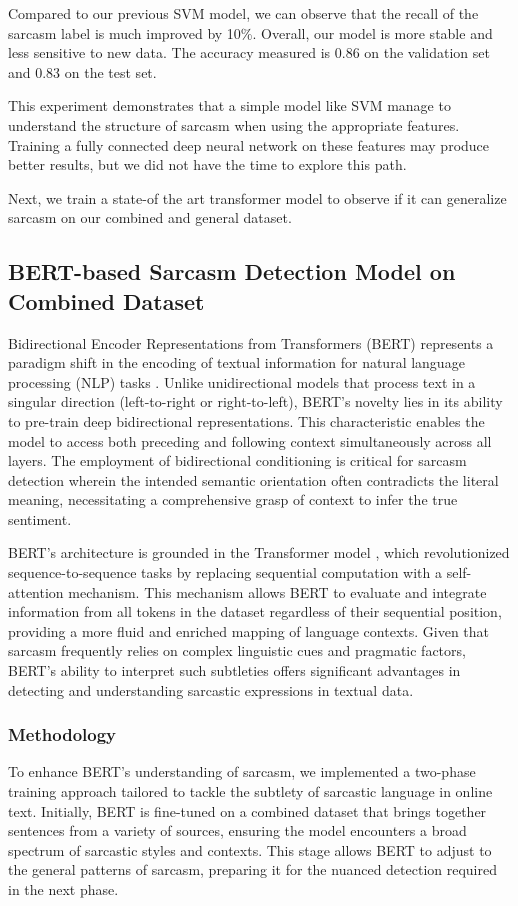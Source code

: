 \documentclass[10pt,twocolumn,letterpaper]{article}
\begin{document}
Compared to our previous SVM model, we can observe that the recall of the sarcasm label is much improved by 10\%.
Overall, our model is more stable and less sensitive to new data.
The accuracy measured is 0.86 on the validation set and 0.83 on the test set.

This experiment demonstrates that a simple model like SVM manage to understand the structure of sarcasm when using the appropriate features.
Training a fully connected deep neural network on these features may produce better results, but we did not have the time to explore this path.

Next, we train a state-of the art transformer model to observe if it can generalize sarcasm on our combined and general dataset.

\subsection{BERT-based Sarcasm Detection Model on Combined Dataset}

Bidirectional Encoder Representations from Transformers (BERT) represents a paradigm shift in the encoding of textual information for natural language processing (NLP) tasks \cite{devlin2018bert}. Unlike unidirectional models that process text in a singular direction (left-to-right or right-to-left), BERT's novelty lies in its ability to pre-train deep bidirectional representations. This characteristic enables the model to access both preceding and following context simultaneously across all layers. The employment of bidirectional conditioning is critical for sarcasm detection wherein the intended semantic orientation often contradicts the literal meaning, necessitating a comprehensive grasp of context to infer the true sentiment.

BERT's architecture is grounded in the Transformer model \cite{vaswani2017attention}, which revolutionized sequence-to-sequence tasks by replacing sequential computation with a self-attention mechanism. This mechanism allows BERT to evaluate and integrate information from all tokens in the dataset regardless of their sequential position, providing a more fluid and enriched mapping of language contexts. Given that sarcasm frequently relies on complex linguistic cues and pragmatic factors, BERT's ability to interpret such subtleties offers significant advantages in detecting and understanding sarcastic expressions in textual data.

\subsubsection{Methodology}  
To enhance BERT's understanding of sarcasm, we implemented a two-phase training approach tailored to tackle the subtlety of sarcastic language in online text. Initially, BERT is fine-tuned on a combined dataset that brings together sentences from a variety of sources, ensuring the model encounters a broad spectrum of sarcastic styles and contexts. This stage allows BERT to adjust to the general patterns of sarcasm, preparing it for the nuanced detection required in the next phase.
\end{document}

